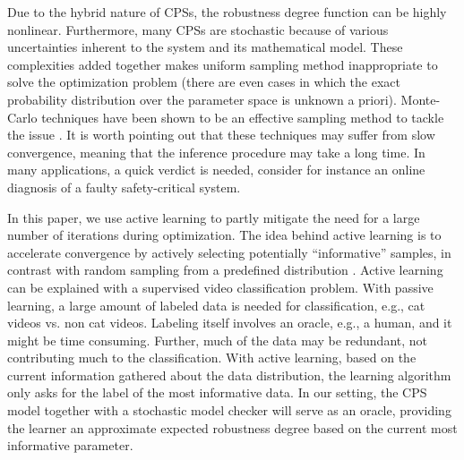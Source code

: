 \documentclass[10pt]{article}
\theoremstyle{plain}
\begin{document}
Due to the hybrid nature of CPSs, the robustness degree function can be highly nonlinear. Furthermore, many CPSs are stochastic because of various uncertainties inherent to the system and its mathematical model. These complexities added together makes uniform sampling method inappropriate to solve the optimization problem (there are even cases in which the exact probability distribution over the parameter space is unknown a priori). Monte-Carlo techniques have been shown to be an effective sampling method to tackle the issue \cite{abbas2013probabilistic,jin2013mining}. It is worth pointing out that these techniques may suffer from slow convergence, meaning that the inference procedure may take a long time. In many applications, a quick verdict is needed, consider for instance an online diagnosis of a faulty safety-critical system.

In this paper, we use active learning to partly mitigate the need for a large number of iterations during optimization. The idea behind active learning is to accelerate convergence by actively selecting potentially ``informative'' samples, in contrast with random sampling from a predefined distribution \cite{Settles2010,ramdas2013algorithmic}. Active learning can be explained with a supervised video classification problem. With passive learning, a large amount of labeled data is needed for classification, e.g., cat videos vs. non cat videos. Labeling itself involves an oracle, e.g., a human, and it might be time consuming. Further, much of the data may be redundant, not contributing much to the classification. With active learning, based on the current information gathered about the data distribution, the learning algorithm only asks for the label of the most informative data. In our setting, the CPS model together with a stochastic model checker will serve as an oracle, providing the learner an approximate expected robustness degree based on the current most informative parameter. 
\end{document}
